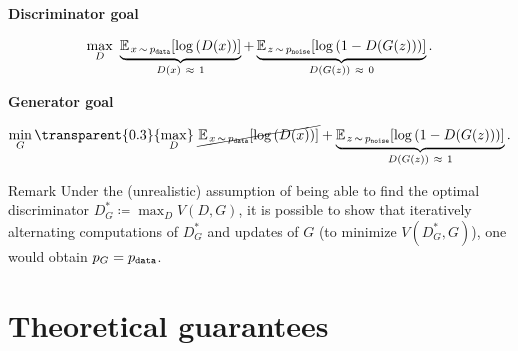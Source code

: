 \documentclass{beamer}
\begin{document}
	\begin{frame}
		\begin{center} \textbf{Discriminator goal} \end{center}
		\begin{equation*}
			\max_{D} \ \underbrace{\mean[x \sim p_\text{\texttt{data}}]{\log{D(x)}}}_{D(x) \ \approx \ 1} + \underbrace{\mean[z \sim p_\text{\texttt{noise}}]{\log{1 - D(G(z))}}}_{D(G(z)) \ \approx \ 0}.
		\end{equation*}
		\begin{center} \textbf{Generator goal} \end{center}
		\begin{equation*}
			\min_{G} {\transparent{0.3}{\max_{D}}} \ \cancel{\mean[x \sim p_\text{\texttt{data}}]{\log{D(x)}}} + \underbrace{\mean[z \sim p_\text{\texttt{noise}}]{\log{1 - D(G(z))}}}_{D(G(z)) \ \approx \ 1}.
		\end{equation*}
		\begin{block}{Remark}
			Under the (unrealistic) assumption of being able to find the optimal discriminator $D^*_G \coloneqq \max_{D} V(D, G)$, it is possible to show that iteratively alternating computations of $D^*_G$ and updates of $G$ (to minimize $V(D^*_G, G)$), one would obtain $p_G = p_{\text{\texttt{data}}}$.
		\end{block}
	\end{frame}
	

	\section{Theoretical guarantees}
\end{document}
